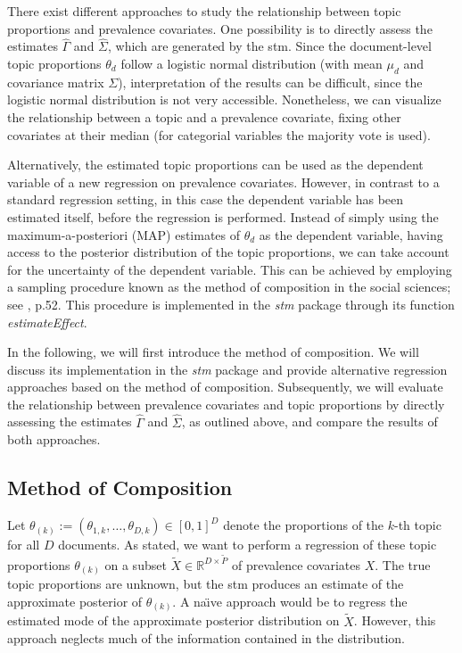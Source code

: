 There exist different approaches to study the relationship between topic proportions and prevalence covariates. One possibility is to directly assess the estimates $\hat{\Gamma}$ and $\hat{\Sigma}$, which are generated by the stm. Since the document-level topic proportions $\theta_d$ follow a logistic normal distribution (with mean $\mu_d$ and covariance matrix $\Sigma$), interpretation of the results can be difficult, since the logistic normal distribution is not very accessible. Nonetheless, we can visualize the relationship between a topic and a prevalence covariate, fixing other covariates at their median (for categorial variables the majority vote is used).

Alternatively, the estimated topic proportions can be used as the dependent variable of a new regression on prevalence covariates. However, in contrast to a standard regression setting, in this case the dependent variable has been estimated itself, before the regression is performed. Instead of simply using the maximum-a-posteriori (MAP) estimates of $\theta_d$ as the dependent variable, having access to the posterior distribution of the topic proportions, we can take account for the uncertainty of the dependent variable. This can be achieved by employing a sampling procedure known as the method of composition in the social sciences; see \cite{tanner2012tools}, p.52. This procedure is implemented in the \textit{stm} package through its function \textit{estimateEffect}.

In the following, we will first introduce the method of composition. We will discuss its implementation in the \textit{stm} package and provide alternative regression approaches based on the method of composition. Subsequently, we will evaluate the relationship between prevalence covariates and topic proportions by directly assessing the estimates $\hat{\Gamma}$ and $\hat{\Sigma}$, as outlined above, and compare the results of both approaches.

\subsection{Method of Composition}

Let $\theta_{(k)}:=(\theta_{1,k}, \dots, \theta_{D,k}) \in [0,1]^{D}$ denote the proportions of the $k$-th topic for all $D$ documents. As stated, we want to perform a regression of these topic proportions $\theta_{(k)}$ on a subset $\tilde{X} \in \mathbb{R}^{D \times \tilde{P}}$ of prevalence covariates $X$. The true topic proportions are unknown, but the stm produces an estimate of the approximate posterior of $\theta_{(k)}$. A na{\"\i}ve approach would be to regress the estimated mode of the approximate posterior distribution on $\tilde{X}$. However, this approach neglects much of the information contained in the distribution. 

